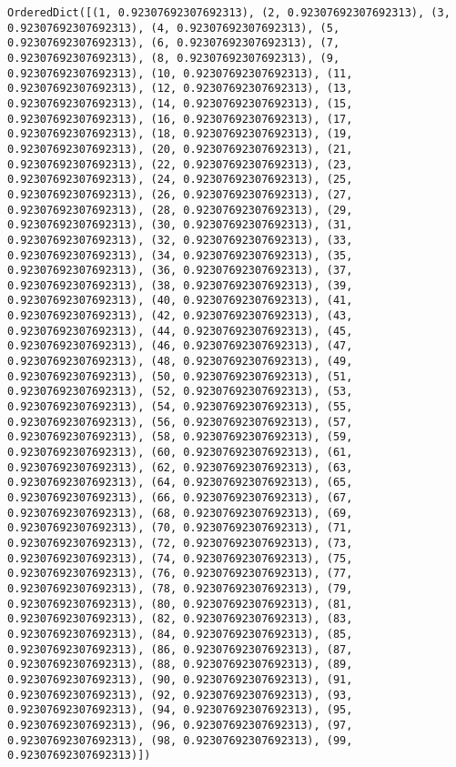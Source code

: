 \documentclass[11pt]{article}
\begin{document}
\begin{Verbatim}[commandchars=\\\{\}]
OrderedDict([(1, 0.92307692307692313), (2, 0.92307692307692313), (3, 0.92307692307692313), (4, 0.92307692307692313), (5, 0.92307692307692313), (6, 0.92307692307692313), (7, 0.92307692307692313), (8, 0.92307692307692313), (9, 0.92307692307692313), (10, 0.92307692307692313), (11, 0.92307692307692313), (12, 0.92307692307692313), (13, 0.92307692307692313), (14, 0.92307692307692313), (15, 0.92307692307692313), (16, 0.92307692307692313), (17, 0.92307692307692313), (18, 0.92307692307692313), (19, 0.92307692307692313), (20, 0.92307692307692313), (21, 0.92307692307692313), (22, 0.92307692307692313), (23, 0.92307692307692313), (24, 0.92307692307692313), (25, 0.92307692307692313), (26, 0.92307692307692313), (27, 0.92307692307692313), (28, 0.92307692307692313), (29, 0.92307692307692313), (30, 0.92307692307692313), (31, 0.92307692307692313), (32, 0.92307692307692313), (33, 0.92307692307692313), (34, 0.92307692307692313), (35, 0.92307692307692313), (36, 0.92307692307692313), (37, 0.92307692307692313), (38, 0.92307692307692313), (39, 0.92307692307692313), (40, 0.92307692307692313), (41, 0.92307692307692313), (42, 0.92307692307692313), (43, 0.92307692307692313), (44, 0.92307692307692313), (45, 0.92307692307692313), (46, 0.92307692307692313), (47, 0.92307692307692313), (48, 0.92307692307692313), (49, 0.92307692307692313), (50, 0.92307692307692313), (51, 0.92307692307692313), (52, 0.92307692307692313), (53, 0.92307692307692313), (54, 0.92307692307692313), (55, 0.92307692307692313), (56, 0.92307692307692313), (57, 0.92307692307692313), (58, 0.92307692307692313), (59, 0.92307692307692313), (60, 0.92307692307692313), (61, 0.92307692307692313), (62, 0.92307692307692313), (63, 0.92307692307692313), (64, 0.92307692307692313), (65, 0.92307692307692313), (66, 0.92307692307692313), (67, 0.92307692307692313), (68, 0.92307692307692313), (69, 0.92307692307692313), (70, 0.92307692307692313), (71, 0.92307692307692313), (72, 0.92307692307692313), (73, 0.92307692307692313), (74, 0.92307692307692313), (75, 0.92307692307692313), (76, 0.92307692307692313), (77, 0.92307692307692313), (78, 0.92307692307692313), (79, 0.92307692307692313), (80, 0.92307692307692313), (81, 0.92307692307692313), (82, 0.92307692307692313), (83, 0.92307692307692313), (84, 0.92307692307692313), (85, 0.92307692307692313), (86, 0.92307692307692313), (87, 0.92307692307692313), (88, 0.92307692307692313), (89, 0.92307692307692313), (90, 0.92307692307692313), (91, 0.92307692307692313), (92, 0.92307692307692313), (93, 0.92307692307692313), (94, 0.92307692307692313), (95, 0.92307692307692313), (96, 0.92307692307692313), (97, 0.92307692307692313), (98, 0.92307692307692313), (99, 0.92307692307692313)])

\end{Verbatim}
\end{document}
